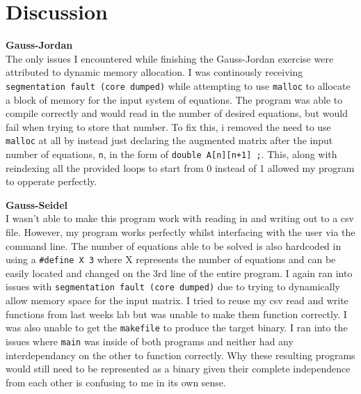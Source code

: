 \documentclass[11pt]{report}
\newcommand{\code}[1]{\colorbox{light-gray}{\texttt{#1}}}
\begin{document}
\section{Discussion}
\begin{outline}
\item \textbf{Gauss-Jordan}
\\ The only issues I encountered while finishing the Gauss-Jordan exercise were attributed to dynamic memory allocation. I was continously receiving \code{segmentation fault (core dumped)} while attempting to use \code{malloc} to allocate a block of memory for the input system of equations. The program was able to compile correctly and would read in the number of desired equations, but would fail when trying to store that number. To fix this, i removed the need to use \code{malloc} at all by instead just declaring the augmented matrix after the input number of equations, \code{n}, in the form of \code{double A[n][n+1] ;}. This, along with reindexing all the provided loops to start from 0 instead of 1 allowed my program to opperate perfectly. 
\item \textbf{Gauss-Seidel}
\\ I wasn't able to make this program work with reading in and writing out to a csv file. However, my program works perfectly whilst interfacing with the user via the command line. The number of equations able to be solved is also hardcoded in using a \code{#define X 3} where X represents the number of equations and can be easily located and changed on the 3rd line of the entire program. I again ran into issues with \code{segmentation fault (core dumped)} due to trying to dynamically allow memory space for the input matrix. I tried to reuse my csv read and write functions from last weeks lab but was unable to make them function correctly. I was also unable to get the \code{makefile} to produce the target binary. I ran into the issues where \code{main} was inside of both programs and neither had any interdependancy on the other to function correctly. Why these resulting programs would still need to be represented as a binary given their complete independence from each other is confusing to me in its own sense.
\end{outline}
\newpage
\end{document}
